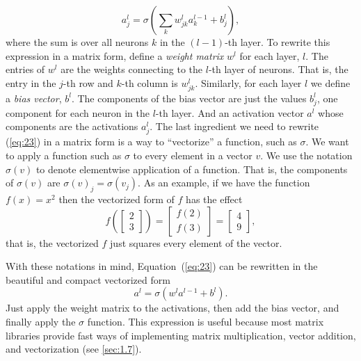 \documentclass[a4paper,twoside,10pt]{book}
\begin{document}
\begin{equation}
	a^{l}_j = \sigma\left( \sum_k w^{l}_{jk} a^{l-1}_k + b^l_j \right),\tag{23}\label{eq:23}
\end{equation}
where the sum is over all neurons $k$ in the $(l-1)$-th layer. To rewrite this expression in a matrix form, define a \textit{weight matrix} $w^l$ for each layer, $l$. The entries of $w^l$ are the weights connecting to the $l$-th layer of neurons. That is, the entry in the $j$-th row and $k$-th column is $w^l_{jk}$. Similarly, for each layer $l$ we define a \textit{bias vector}, $b^l$. The components of the bias vector are just the values $b^l_j$, one component for each neuron in the $l$-th layer. And an activation vector $a^l$ whose components are the activations $a^l_j$.
The last ingredient we need to rewrite (\ref{eq:23}) in a matrix form is a way to ``vectorize'' a function, such as $\sigma$. We want to apply a function such as $\sigma$ to every element in a vector $v$. We use the notation $\sigma(v)$ to denote elementwise application of a function. That is, the components of $\sigma(v)$ are $\sigma(v)_j = \sigma(v_j)$. As an example, if we have the function $f(x)=x^2$ then the vectorized form of $f$ has the effect
\begin{equation}
f\left(\left[ \begin{array}{c} 2 \\ 3 \end{array} \right] \right)
= \left[ \begin{array}{c} f(2) \\ f(3) \end{array} \right]
= \left[ \begin{array}{c} 4 \\ 9 \end{array} \right],
\tag{24}\label{eq:24}
\end{equation}
that is, the vectorized $f$ just squares every element of the vector.

With these notations in mind, Equation~(\ref{eq:23}) can be rewritten in the beautiful and compact vectorized form
\begin{equation}
a^{l} = \sigma(w^l a^{l-1}+b^l).
\tag{25}\label{eq:25}
\end{equation}
Just apply the weight matrix to the activations, then add the bias vector, and finally apply the $\sigma$ function. This expression is useful because most matrix libraries provide fast ways of implementing matrix multiplication, vector addition, and vectorization (see \ref{sec:1.7}).
\end{document}

